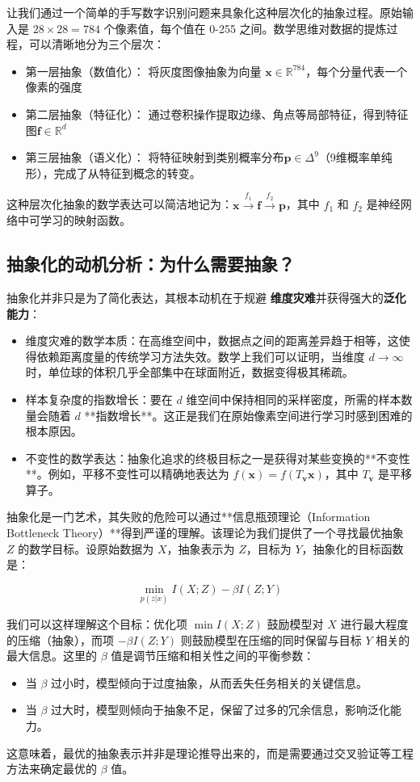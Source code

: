 让我们通过一个简单的手写数字识别问题来具象化这种层次化的抽象过程。原始输入是 $28 \times 28 = 784$ 个像素值，每个值在 0-255 之间。数学思维对数据的提炼过程，可以清晰地分为三个层次：

\begin{itemize}
\item 第一层抽象（数值化）： 将灰度图像抽象为向量 $\mathbf{x} \in \mathbb{R}^{784}$，每个分量代表一个像素的强度
\item 第二层抽象（特征化）： 通过卷积操作提取边缘、角点等局部特征，得到特征图$\mathbf{f} \in \mathbb{R}^{d}$
\item 第三层抽象（语义化）： 将特征映射到类别概率分布$\mathbf{p} \in \Delta^{9}$（9维概率单纯形），完成了从特征到概念的转变。
\end{itemize}

这种层次化抽象的数学表达可以简洁地记为：$\mathbf{x} \xrightarrow{f_1} \mathbf{f} \xrightarrow{f_2} \mathbf{p}$，其中 $f_1$ 和 $f_2$ 是神经网络中可学习的映射函数。

\subsection*{抽象化的动机分析：为什么需要抽象？}

抽象化并非只是为了简化表达，其根本动机在于规避 \textbf{维度灾难}并获得强大的\textbf{泛化能力}：
\begin{itemize}
\item 维度灾难的数学本质：在高维空间中，数据点之间的距离差异趋于相等，这使得依赖距离度量的传统学习方法失效。数学上我们可以证明，当维度 $d \to \infty$ 时，单位球的体积几乎全部集中在球面附近，数据变得极其稀疏。
\item 样本复杂度的指数增长：要在 $d$ 维空间中保持相同的采样密度，所需的样本数量会随着 $d$ **指数增长**。这正是我们在原始像素空间进行学习时感到困难的根本原因。
\item 不变性的数学表达：抽象化追求的终极目标之一是获得对某些变换的**不变性**。例如，平移不变性可以精确地表达为 $f(\mathbf{x}) = f(T_{\mathbf{v}}\mathbf{x})$，其中 $T_{\mathbf{v}}$ 是平移算子。
\end{itemize}

抽象化是一门艺术，其失败的危险可以通过**信息瓶颈理论（Information Bottleneck Theory）**得到严谨的理解。该理论为我们提供了一个寻找最优抽象 $Z$ 的数学目标。设原始数据为 $X$，抽象表示为 $Z$，目标为 $Y$，抽象化的目标函数是：

$$\min_{p(z|x)} I(X;Z) - \beta I(Z;Y)$$

我们可以这样理解这个目标：优化项 $\min I(X;Z)$ 鼓励模型对 $X$ 进行最大程度的压缩（抽象），而项 $-\beta I(Z;Y)$ 则鼓励模型在压缩的同时保留与目标 $Y$ 相关的最大信息。这里的 $\beta$ 值是调节压缩和相关性之间的平衡参数：
\begin{itemize}
    \item 当 $\beta$ 过小时，模型倾向于过度抽象，从而丢失任务相关的关键信息。
    \item 当 $\beta$ 过大时，模型则倾向于抽象不足，保留了过多的冗余信息，影响泛化能力。
\end{itemize}
这意味着，最优的抽象表示并非是理论推导出来的，而是需要通过交叉验证等工程方法来确定最优的 $\beta$ 值。

